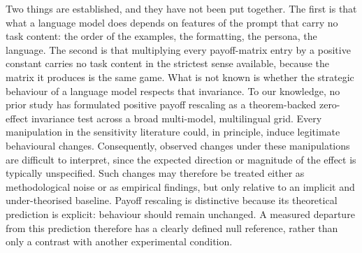 \documentclass[11pt,a4paper]{article}
\begin{document}
Two things are established, and they have not been put together. The first is
that what a language model does depends on features of the prompt that carry no
task content: the order of the examples, the formatting, the persona, the
language. The second is that multiplying every payoff-matrix entry by a positive constant
carries no task content in the strictest sense available, because the matrix it
produces is  the same game. What is not known is whether
the strategic behaviour of a language model respects that invariance. To our
knowledge, no prior study has formulated positive payoff rescaling as a
theorem-backed zero-effect invariance test across a broad multi-model,
multilingual grid. Every manipulation in the sensitivity literature could, in principle, induce legitimate behavioural changes.  
Consequently, observed changes under these manipulations are difficult to interpret, since the expected direction or magnitude of the effect is typically unspecified. Such changes may therefore be treated either as methodological noise or as empirical findings, but only relative to an implicit and under-theorised baseline. Payoff rescaling is distinctive because its theoretical prediction is explicit: behaviour should remain unchanged. A measured departure from this prediction therefore has a clearly defined null reference, rather than only a contrast with another experimental condition.

\end{document}

